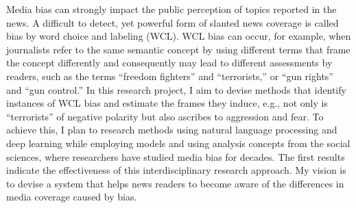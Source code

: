 Media bias can strongly impact the public perception of topics reported in the news. A difficult to detect, yet powerful form of slanted news coverage is called bias by word choice and labeling (WCL). WCL bias can occur, for example, when journalists refer to the same semantic concept by using different terms that frame the concept differently and consequently may lead to different assessments by readers, such as the terms ``freedom fighters'' and ``terrorists,'' or ``gun rights'' and ``gun control.'' In this research project, I aim to devise methods that identify instances of WCL bias and estimate the frames they induce, e.g., not only is ``terrorists'' of negative polarity but also ascribes to aggression and fear. To achieve this, I plan to research methods using natural language processing and deep learning while employing models and using analysis concepts from the social sciences, where researchers have studied media bias for decades. The first results indicate the effectiveness of this interdisciplinary research approach. My vision is to devise a system that helps news readers to become aware of the differences in media coverage caused by bias.
